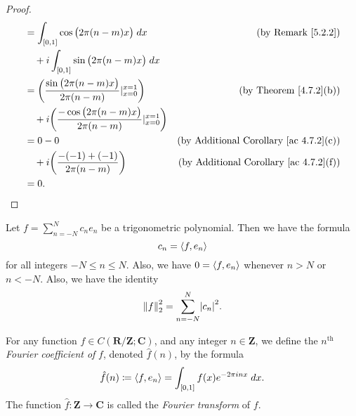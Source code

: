 \begin{proof}
\begin{align*}
         & = \int_{[0, 1]} \cos\big(2 \pi (n - m) x\big) \; dx                                         & \text{(by Remark \ref{5.2.2})}                     \\
         & \quad + i \int_{[0, 1]} \sin\big(2 \pi (n - m) x\big) \; dx                                                                                      \\
         & = \bigg(\frac{\sin\big(2 \pi (n - m) x\big)}{2 \pi (n - m)}|_{x = 0}^{x = 1}\bigg)          & \text{(by Theorem \ref{4.7.2}(b))}                 \\
         & \quad + i \bigg(\frac{-\cos\big(2 \pi (n - m) x\big)}{2 \pi (n - m)}|_{x = 0}^{x = 1}\bigg)                                                      \\
         & = 0 - 0                                                                                     & \text{(by Additional Corollary \ref{ac 4.7.2}(c))} \\
         & \quad + i \bigg(\frac{- (-1) + (-1)}{2 \pi (n - m)}\bigg)                                   & \text{(by Additional Corollary \ref{ac 4.7.2}(f))} \\
         & = 0.
    \end{align*}
\end{proof}

\begin{corollary}\label{5.3.6}
    Let \(f = \sum_{n = -N}^N c_n e_n\) be a trigonometric polynomial.
    Then we have the formula
    \[
        c_n = \inner*{f, e_n}
    \]
    for all integers \(-N \leq n \leq N\).
    Also, we have \(0 = \inner*{f, e_n}\) whenever \(n > N\) or \(n < -N\).
    Also, we have the identity
    \[
        \norm*{f}_2^2 = \sum_{n = -N}^N \abs*{c_n}^2.
    \]
\end{corollary}

\begin{definition}\label{5.3.7}
    For any function \(f \in C(\mathbf{R} / \mathbf{Z} ; \mathbf{C})\), and any integer \(n \in \mathbf{Z}\), we define the \(n^{\text{th}}\) \emph{Fourier coefficient of} \(f\), denoted \(\hat{f}(n)\), by the formula
    \[
        \hat{f}(n) \coloneqq \inner*{f, e_n} = \int_{[0, 1]} f(x) e^{- 2 \pi i n x} \; dx.
    \]
    The function \(\hat{f} : \mathbf{Z} \to \mathbf{C}\) is called the \emph{Fourier transform} of \(f\).
\end{definition}

